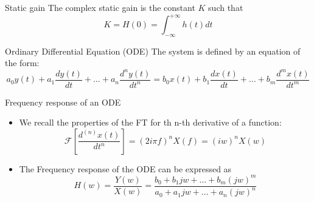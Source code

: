 \begin{block}{Static gain}
  The complex static gain is the constant $K$ such that
  \begin{equation*}
    K=H(0)=\int_{-\infty}^{+\infty}h(t)dt
  \end{equation*}
\end{block}



\begin{block}{Ordinary Differential Equation (ODE)}
    The system is defined by an equation of the form:
    \begin{equation}
      \label{eq:edo2}
      a_0y(t)+a_1\frac{dy(t)}{dt}+\dots+a_n\frac{d^ny(t)}{dt^n}=
      b_0x(t)+b_1\frac{dx(t)}{dt} +\dots+b_m\frac{d^mx(t)}{dt^m}
    \end{equation}
    
    
    
    \end{block}
    
    \begin{block}{Frequency response of an ODE}
      \begin{itemize}
        \item We recall the properties of the FT for th n-th derivative of a function:
         $$ \mathcal{F}\left[\frac{d^{(n)}x(t)}{dt^n}\right]=(2i\pi
        f)^nX(f)=(iw)^nX(w)$$
        \item The Frequency response of the ODE can be expressed as 
        \begin{equation}
          \label{eq:edo_transf}
          H(w)=\frac{Y(w)}{X(w)}=\frac{b_0+b_1jw+\dots+b_m(jw)^m}{a_0+a_1jw+\dots+a_n(jw)^n}
        \end{equation}
      \end{itemize}
    \end{block}

